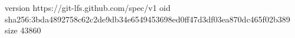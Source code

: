 version https://git-lfs.github.com/spec/v1
oid sha256:3bda4892758c62c2de9db34e6549453698ed0ff47d3df03ea870dc465f02b389
size 43860
